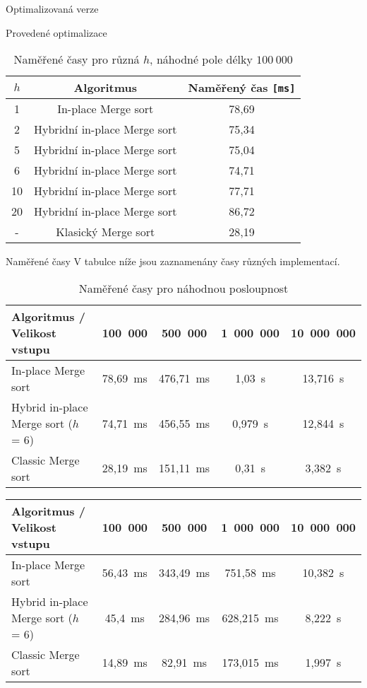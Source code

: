 \documentclass[a4paper,11pt]{article}
\begin{document}
\begin{section}{Optimalizovaná verze}
\begin{subsection}{Provedené optimalizace}
\begin{table}[ht]\centering
\begin{tabular}{|c|c|c|}
\hline
$h$ & Algoritmus & Naměřený čas \texttt{[ms]}\\ \hline
\hline
1 & In-place Merge sort & 78,69\\
2 & Hybridní in-place Merge sort & 75,34\\
5 & Hybridní in-place Merge sort & 75,04\\
6 & Hybridní in-place Merge sort & 74,71\\
10 & Hybridní in-place Merge sort & 77,71\\
20 & Hybridní in-place Merge sort & 86,72\\
- & Klasický Merge sort & 28,19\\
\hline
\end{tabular}
\caption{Naměřené časy pro různá $h$, náhodné pole délky $100~000$}
\label{table:four}
\end{table}
\end{subsection}
\pagebreak

\begin{subsection}{Naměřené časy}
V tabulce níže jsou zaznamenány časy různých implementací.

\begin{table}[h]\centering
\begin{tabular}{|l|c|c|c|c|}
\hline
Algoritmus / Velikost vstupu & 100~000 & 500~000 & 1~000~000 & 10~000~000\\
\hline\hline
In-place Merge sort & 78,69~ms & 476,71~ms & 1,03~s & 13,716~s\\
Hybrid in-place Merge sort ($h$ = 6) & 74,71~ms & 456,55~ms & 0,979~s & 12,844~s\\
Classic Merge sort & 28,19~ms & 151,11~ms & 0,31~s & 3,382~s\\
\hline

\end{tabular}
\caption{Naměřené časy pro náhodnou posloupnost}
\label{table:five}
\end{table}


\begin{table}[h]\centering
\begin{tabular}{|l|c|c|c|c|}
\hline
Algoritmus / Velikost vstupu & 100~000 & 500~000 & 1~000~000 & 10~000~000\\
\hline\hline
In-place Merge sort & 56,43~ms & 343,49~ms & 751,58~ms & 10,382~s\\
Hybrid in-place Merge sort ($h$ = 6) & 45,4~ms & 284,96~ms & 628,215~ms & 8,222~s\\
Classic Merge sort & 14,89~ms & 82,91~ms & 173,015~ms & 1,997~s\\
\hline


\end{tabular}
\end{table}
\end{subsection}
\end{section}
\end{document}
